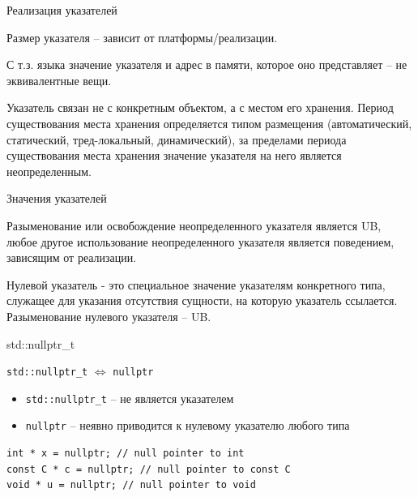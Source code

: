 \documentclass[unknownkeysallowed,xcolor=table]{beamer}
\begin{document}
\begin{frame}{Реализация указателей}

Размер указателя -- зависит от платформы/реализации.

\vspace{2em}

С т.з. языка значение указателя и адрес в памяти, которое оно представляет -- не эквивалентные вещи.

\vspace{2em}

Указатель связан не с конкретным объектом, а с местом его хранения. Период существования места хранения определяется типом размещения (автоматический, статический, тред-локальный, динамический), за пределами периода существования места хранения значение указателя на него является неопределенным.

\end{frame}

\begin{frame}{Значения указателей}

Разыменование или освобождение неопределенного указателя является UB, любое другое использование неопределенного указателя является поведением, зависящим от реализации.

\vspace{2em}

Нулевой указатель - это специальное значение указателям конкретного типа, служащее для указания отсутствия сущности, на которую указатель ссылается. Разыменование нулевого указателя -- UB.

\end{frame}

\begin{frame}[fragile]{std::nullptr\_t}

\begin{center}
\lstinline{std::nullptr_t} $\Leftrightarrow$ \lstinline{nullptr}
\end{center}

\vspace{1em}

\begin{itemize}
  \item \lstinline{std::nullptr_t} -- не является указателем
  \item \lstinline{nullptr} -- неявно приводится к нулевому указателю любого типа
\end{itemize}

\begin{lstlisting}
int * x = nullptr; // null pointer to int
const C * c = nullptr; // null pointer to const C
void * u = nullptr; // null pointer to void
\end{lstlisting}

\end{frame}
\end{document}
